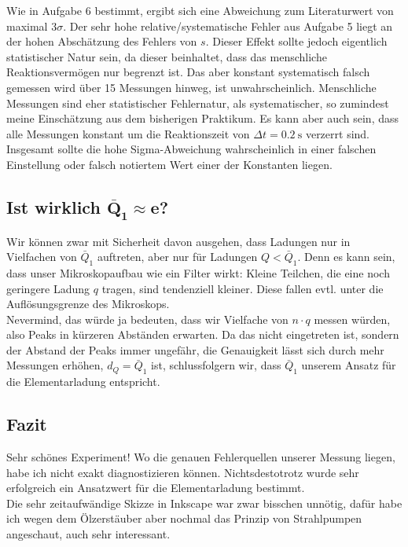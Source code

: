 Wie in Aufgabe 6 bestimmt, ergibt sich eine Abweichung zum Literaturwert von maximal \(3\sigma\). Der sehr hohe relative/systematische Fehler aus Aufgabe 5 liegt an der hohen Abschätzung des Fehlers von \(s\). Dieser Effekt sollte jedoch eigentlich statistischer Natur sein, da dieser beinhaltet, dass das menschliche Reaktionsvermögen nur begrenzt ist. Das aber konstant systematisch falsch gemessen wird über 15 Messungen hinweg, ist unwahrscheinlich. Menschliche Messungen sind eher statistischer Fehlernatur, als systematischer, so zumindest meine Einschätzung aus dem bisherigen Praktikum. Es kann aber auch sein, dass alle Messungen konstant um die Reaktionszeit von \(\Delta t=\qty{0.2}{\s}\) verzerrt sind. \\
Insgesamt sollte die hohe Sigma-Abweichung wahrscheinlich in einer falschen Einstellung oder falsch notiertem Wert einer der Konstanten liegen. 

\subsection[\texorpdfstring{Ist wirklich \(\bar{Q}_1\approx e\)?}{Ist wirklich Q ungefähr e?}]{Ist wirklich \(\boldsymbol{\bar{Q}_1\approx e}\)?}
Wir können zwar mit Sicherheit davon ausgehen, dass Ladungen nur in Vielfachen von \(\bar{Q}_1\) auftreten, aber nur für Ladungen \(Q<\bar{Q}_1\). Denn es kann sein, dass unser Mikroskopaufbau wie ein Filter wirkt: Kleine Teilchen, die eine noch geringere Ladung \(q\) tragen, sind tendenziell kleiner. Diese fallen evtl. unter die Auflösungsgrenze des Mikroskops. \\
Nevermind, das würde ja bedeuten, dass wir Vielfache von \(n\cdot q\) messen würden, also Peaks in kürzeren Abständen erwarten. Da das nicht eingetreten ist, sondern der Abstand der Peaks immer ungefähr, die Genauigkeit lässt sich durch mehr Messungen erhöhen, \(d_Q=\bar{Q}_1\) ist, schlussfolgern wir, dass \(\bar{Q}_1\) unserem Ansatz für die Elementarladung entspricht.

\subsection{Fazit}
Sehr schönes Experiment! Wo die genauen Fehlerquellen unserer Messung liegen, habe ich nicht exakt diagnostizieren können. 
Nichtsdestotrotz wurde sehr erfolgreich ein Ansatzwert für die Elementarladung bestimmt.\\
Die sehr zeitaufwändige Skizze in Inkscape war zwar bisschen unnötig, dafür habe ich wegen dem Ölzerstäuber aber nochmal das Prinzip von Strahlpumpen angeschaut, auch sehr interessant. 

